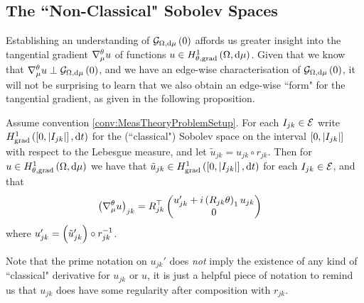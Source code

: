 \subsection{The ``Non-Classical" Sobolev Spaces} \label{ssec:SobSpacesTheory}
Establishing an understanding of $\mathcal{G}_{ \Omega, \mathrm{d}\mu}\left( 0 \right)$  affords us greater insight into the tangential gradient $\nabla^{\theta}_\mu u$ of functions $u\in H^1_{\theta, \mathrm{grad}}\left( \Omega, \mathrm{d}\mu \right)$.
Given that we know that $\nabla^{\theta}_\mu u \perp \mathcal{G}_{ \Omega, \mathrm{d}\mu}\left( 0 \right)$, and we have an edge-wise characterisation of $\mathcal{G}_{ \Omega, \mathrm{d}\mu}\left( 0 \right)$, it will not be surprising to learn that we also obtain an edge-wise ``form" for the tangential gradient, as given in the following proposition.
\begin{prop} \label{prop:GraphTangGrad}
	Assume convention \ref{conv:MeasTheoryProblemSetup}.
	For each $I_{jk}\in \mathcal{E}$ write $H^1_\mathrm{grad}\left( \left[ 0,\left\lvert I_{jk} \right\rvert \right], \mathrm{d}t \right)$ for the (``classical") Sobolev space on the interval $\left[ 0,\left\lvert I_{jk} \right\rvert \right]$ with respect to the Lebesgue measure, and let $\tilde{u}_{jk} = u_{jk} \circ r_{jk}$.
	Then for $u\in H^1_{\theta, \mathrm{grad}}\left( \Omega, \mathrm{d}\mu \right)$ we have that $\tilde{u}_{jk}\in H^1_\mathrm{grad}\left( \left[ 0,\left\lvert I_{jk} \right\rvert \right], \mathrm{d}t \right)$ for each $I_{jk}\in \mathcal{E}$, and that
	\begin{align*}
		\left(  \nabla^{\theta}_\mu u  \right)_{jk} 
		&= R_{jk}^\top \begin{pmatrix} u_{jk}' + i\left( R_{jk}\theta \right)_1 u_{jk} \\ 0	\end{pmatrix}
	\end{align*}
	where $u_{jk}' = \left(  \tilde{u}_{jk}'  \right) \circ r_{jk}^{-1}$.
\end{prop}
Note that the prime notation on $u_{jk}'$ does \emph{not} imply the existence of any kind of ``classical" derivative for $u_{jk}$ or $u$, it is just a helpful piece of notation to remind us that $u_{jk}$ does have some regularity after composition with $r_{jk}$.
